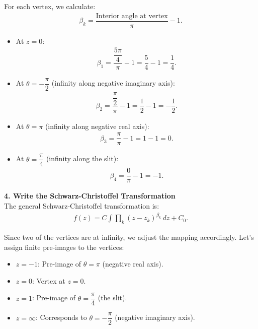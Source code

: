 \begin{example}
    For each vertex, we calculate:
    \begin{align*}
        \beta_k = \dfrac{\text{Interior angle at vertex}}{\pi} - 1.
    \end{align*}
    \begin{itemize}
        \item At $z = 0$:
              \begin{align*}
                  \beta_1 = \dfrac{\dfrac{5\pi}{4}}{\pi} - 1 = \dfrac{5}{4} - 1 = \dfrac{1}{4}.
              \end{align*}
        \item At $\theta = -\dfrac{\pi}{2}$ (infinity along negative imaginary axis):
              \begin{align*}
                  \beta_2 = \dfrac{\dfrac{\pi}{2}}{\pi} - 1 = \dfrac{1}{2} - 1 = -\dfrac{1}{2}.
              \end{align*}
        \item At $\theta = \pi$ (infinity along negative real axis):
              \begin{align*}
                  \beta_3 = \dfrac{\pi}{\pi} - 1 = 1 - 1 = 0.
              \end{align*}
        \item At $\theta = \dfrac{\pi}{4}$ (infinity along the slit):
              \begin{align*}
                  \beta_4 = \dfrac{0}{\pi} - 1 = -1.
              \end{align*}
    \end{itemize}

    \textbf{4. Write the Schwarz-Christoffel Transformation} \\

    The general Schwarz-Christoffel transformation is:
    \begin{align*}
        f(z) = C \int \prod_{k} (z - z_k)^{\beta_k} \, dz + C_0.
    \end{align*}

    Since two of the vertices are at infinity, we adjust the mapping accordingly. Let's assign finite pre-images to the vertices:
    \begin{itemize}
        \item $z = -1$: Pre-image of $\theta = \pi$ (negative real axis).
        \item $z = 0$: Vertex at $z = 0$.
        \item $z = 1$: Pre-image of $\theta = \dfrac{\pi}{4}$ (the slit).
        \item $z = \infty$: Corresponds to $\theta = -\dfrac{\pi}{2}$ (negative imaginary axis).
    \end{itemize}


\end{example}
